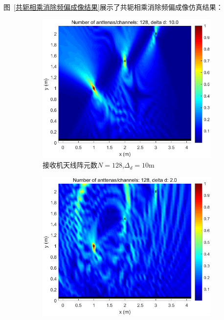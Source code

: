 \clearpage
图~\ref{共轭相乘消除频偏成像结果}展示了共轭相乘消除频偏成像仿真结果：
\begin{figure}[H]
  \centering
  \begin{subfigure}[t]{.45\linewidth}
      \centering
      \includegraphics[width=1\textwidth]{figures/cm/N128d10.eps}
      \caption{接收机天线阵元数$N=128$,$\Delta_d = 10\text{m}$}
  \end{subfigure}
  \begin{subfigure}[t]{.45\linewidth}
      \centering
      \includegraphics[width=1\textwidth]{figures/cm/N128d2.eps}

\end{subfigure}
\end{figure}
